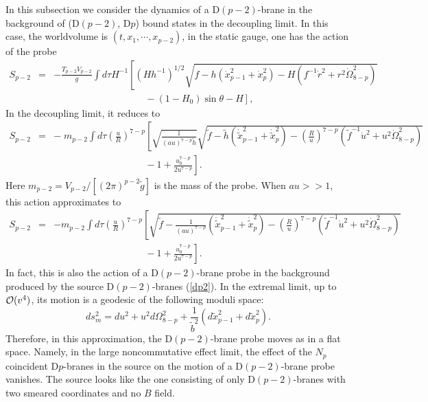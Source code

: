 \documentclass[a4paper,12pt]{article}
\begin{document}
In this subsection we consider the dynamics of a D$(p-2)$-brane in
the background of (D$(p-2)$, D$p$) bound states in the decoupling limit.
In this case, the worldvolume is $(t, x_1, \cdots, x_{p-2})$, in the
static gauge, one has the action of the probe
\begin{eqnarray}
S_{p-2} &=& - \frac{T_{p-2}V_{p-2}}{g}\int d\tau H^{-1}\left [(Hh^{-1})^{1/2}
 \sqrt{f -h(\dot{x}_{p-1}^2 +\dot{x}_p^2)
 -H(f^{-1}\dot{r}^2 + r^2 \dot{\Omega}_{8-p}^2)} \right. \nonumber \\
&& \hspace{4cm} - \left. (1-H_0)\sin\theta -H\right],
\end{eqnarray}
In the decoupling limit, it reduces to
\begin{eqnarray}
S_{p-2} &=& - \; m_{p-2} \int d\tau \left(\frac{u}{R}\right)^{7-p}
 \left [\sqrt{\frac{1}{(au)^{7-p}\tilde{h} }}
 \sqrt{\tilde{f} -\tilde{h}\left (\dot{\tilde x}_{p-1}^2
 +\dot{\tilde x}_p^2 \right) -\left(\frac{R}{u}\right)^{7-p}
 \left(\tilde{f}^{-1} \dot{u}^2 +u^2\dot{\Omega}_{8-p}^2 \right)}
 \right.  \nonumber \\
\label{4e20}
& & \hspace{4cm} - \left. 1 +\frac{u_0^{7-p}}{2u^{7-p}}\right ].
\end{eqnarray}
Here $m_{p-2}= V_{p-2}/[(2\pi)^{p-2}\tilde{g}]$ is the mass of the probe.
When $au >>1$, this action approximates to
\begin{eqnarray}
S_{p-2} &=& - m_{p-2} \int d\tau \left(\frac{u}{R}\right)^{7-p}
 \left [ \sqrt{\tilde{f} -\frac{1}{(au)^{7-p}}\left (\dot{\tilde x}_{p-1}^2
 +\dot{\tilde x}_p^2 \right) -\left(\frac{R}{u}\right)^{7-p}
 \left(\tilde{f}^{-1} \dot{u}^2 +u^2\dot{\Omega}_{8-p}^2 \right)}
 \right.  \nonumber \\
\label{4e21}
& & \hspace{4cm} - \left. 1 +\frac{u_0^{7-p}}{2u^{7-p}}\right ].
\end{eqnarray}
In fact, this is also the action of a D$(p-2)$-brane probe in the
background produced by the source D$(p-2)$-branes (\ref{dp2}). In the
extremal limit, up to ${\cal O}(v^4)$, its motion is a geodesic
of the following moduli space:
\begin{equation}
ds^2_m= du^2 +u^2 d\Omega_{8-p}^2 +
 \frac{1}{\tilde{b}^2}\left (d\tilde{x}_{p-1}^2+ d\tilde{x}_p^2\right).
\end{equation}
Therefore, in this approximation, the D$(p-2)$-brane probe moves as
in a flat space. Namely, in the large noncommutative effect limit,
the effect of the $N_p$ coincident D$p$-branes in the source on the
motion of a D$(p-2)$-brane probe vanishes. The source looks like
the one consisting of only D$(p-2)$-branes with two smeared coordinates
and no $B$ field.
\end{document}
